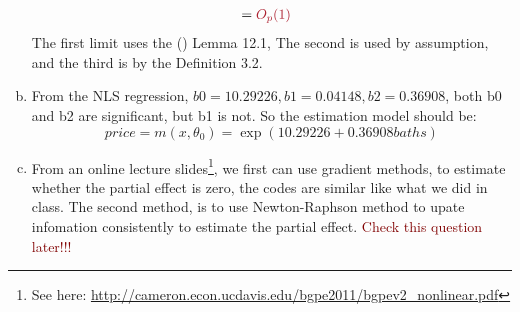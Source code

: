 \documentclass[11pt]{article} %
\begin{document}
\begin{enumerate}[a.]
\begin{align*}
                                         &=\textcolor{Maroon}{O_p(1)}
        \end{align*}
        The first limit uses the (\citet{wooldridge2010econometric}) Lemma 12.1, The second is used by assumption, and the third is by the Definition 3.2. 
    \item From the NLS regression, $b0=10.29226, b1=0.04148, b2=0.36908$, both b0 and b2 are significant, but b1 is not. So the estimation model should be: 
        \begin{equation}
           price= m(x,\theta_0)=\exp(10.29226+0.36908 baths)
        \end{equation}
    \item From an online lecture slides\footnote{See here: \url{http://cameron.econ.ucdavis.edu/bgpe2011/bgpev2_nonlinear.pdf}}, we first can use gradient methods, to estimate whether the partial effect is zero, the codes are similar like what we did in class. The second method, is to use Newton-Raphson method to upate infomation consistently to estimate the partial effect. \textcolor{Maroon}{Check this question later!!! }
\end{enumerate}








































\end{document}
